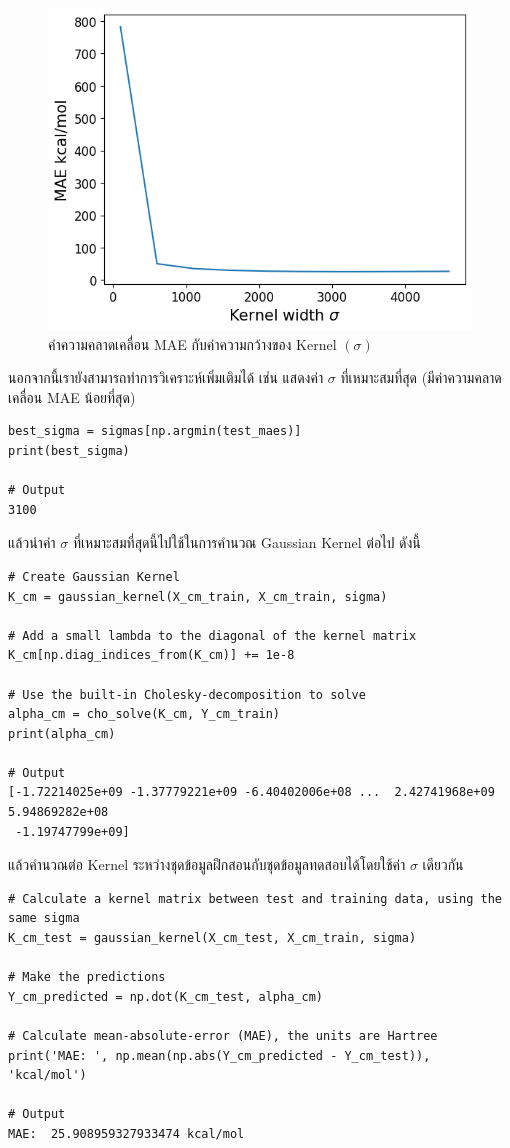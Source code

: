 \begin{figure}[H]
    \centering
    \includegraphics[width=0.5\linewidth]{fig/qm9_cm_mae_sigma.png}
    \caption{ค่าความคลาดเคลื่อน MAE กับค่าความกว้างของ Kernel $(\sigma)$}
    \label{fig:qm9_cm_kernel_mae}
\end{figure}

นอกจากนี้เรายังสามารถทำการวิเคราะห์เพิ่มเติมได้ เช่น แสดงค่า $\sigma$ ที่เหมาะสมที่สุด (มีค่าความคลาดเคลื่อน MAE น้อยที่สุด)

\begin{lstlisting}[style=MyPython]
best_sigma = sigmas[np.argmin(test_maes)]
print(best_sigma)

# Output
3100
\end{lstlisting}

\vspace{1em}

\noindent แล้วนำค่า $\sigma$ ที่เหมาะสมที่สุดนี้ไปใช้ในการคำนวณ Gaussian Kernel ต่อไป ดังนี้

\begin{lstlisting}[style=MyPython]
# Create Gaussian Kernel
K_cm = gaussian_kernel(X_cm_train, X_cm_train, sigma)

# Add a small lambda to the diagonal of the kernel matrix
K_cm[np.diag_indices_from(K_cm)] += 1e-8

# Use the built-in Cholesky-decomposition to solve
alpha_cm = cho_solve(K_cm, Y_cm_train)
print(alpha_cm)

# Output
[-1.72214025e+09 -1.37779221e+09 -6.40402006e+08 ...  2.42741968e+09  5.94869282e+08
 -1.19747799e+09]
\end{lstlisting}

\vspace{1em}

\noindent แล้วคำนวณต่อ Kernel ระหว่างชุดข้อมูลฝึกสอนกับชุดข้อมูลทดสอบได้โดยใช้ค่า $\sigma$ เดียวกัน

\begin{lstlisting}[style=MyPython]
# Calculate a kernel matrix between test and training data, using the same sigma
K_cm_test = gaussian_kernel(X_cm_test, X_cm_train, sigma)

# Make the predictions
Y_cm_predicted = np.dot(K_cm_test, alpha_cm)

# Calculate mean-absolute-error (MAE), the units are Hartree
print('MAE: ', np.mean(np.abs(Y_cm_predicted - Y_cm_test)), 'kcal/mol')

# Output
MAE:  25.908959327933474 kcal/mol
\end{lstlisting}

